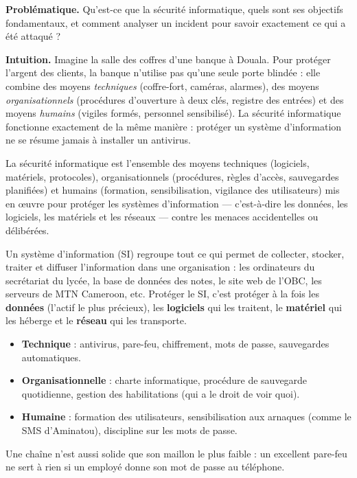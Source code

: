 \documentclass[11pt]{article}
\newcommand{\cle}[1]{{\popxbold\color{popdark}#1}}
\newcounter{popsec}
\newcounter{popsub}
\newcommand{\courssub}[1]{%
  \stepcounter{popsub}%
  \par\vspace{9pt}\noindent{\popxbold\fontsize{11.5}{13}\selectfont\color{popink}{\color{poporange}\thepopsec.\thepopsub}\hspace{6pt}#1}\par\nopagebreak\vspace{4pt}
}
\begin{document}
\textbf{Problématique.} Qu'est-ce que la sécurité informatique, quels sont ses objectifs fondamentaux, et comment analyser un incident pour savoir exactement ce qui a été attaqué ?

\courssub{Qu'est-ce que la sécurité informatique ?}

\textbf{Intuition.} Imagine la salle des coffres d'une banque à Douala. Pour protéger l'argent des clients, la banque n'utilise pas qu'une seule porte blindée : elle combine des moyens \emph{techniques} (coffre-fort, caméras, alarmes), des moyens \emph{organisationnels} (procédures d'ouverture à deux clés, registre des entrées) et des moyens \emph{humains} (vigiles formés, personnel sensibilisé). La sécurité informatique fonctionne exactement de la même manière : protéger un système d'information ne se résume jamais à installer un antivirus.

\begin{definition}
La \cle{sécurité informatique} est l'ensemble des moyens \cle{techniques} (logiciels, matériels, protocoles), \cle{organisationnels} (procédures, règles d'accès, sauvegardes planifiées) et \cle{humains} (formation, sensibilisation, vigilance des utilisateurs) mis en œuvre pour protéger les \cle{systèmes d'information} — c'est-à-dire les données, les logiciels, les matériels et les réseaux — contre les menaces accidentelles ou délibérées.
\end{definition}

Un \cle{système d'information} (SI) regroupe tout ce qui permet de collecter, stocker, traiter et diffuser l'information dans une organisation : les ordinateurs du secrétariat du lycée, la base de données des notes, le site web de l'OBC, les serveurs de MTN Cameroon, etc. Protéger le SI, c'est protéger à la fois les \textbf{données} (l'actif le plus précieux), les \textbf{logiciels} qui les traitent, le \textbf{matériel} qui les héberge et le \textbf{réseau} qui les transporte.

\begin{aretenir}
\begin{itemize}
\item \textbf{Technique} : antivirus, pare-feu, chiffrement, mots de passe, sauvegardes automatiques.
\item \textbf{Organisationnelle} : charte informatique, procédure de sauvegarde quotidienne, gestion des habilitations (qui a le droit de voir quoi).
\item \textbf{Humaine} : formation des utilisateurs, sensibilisation aux arnaques (comme le SMS d'Aminatou), discipline sur les mots de passe.
\end{itemize}
Une chaîne n'est aussi solide que son maillon le plus faible : un excellent pare-feu ne sert à rien si un employé donne son mot de passe au téléphone.
\end{aretenir}
\end{document}
